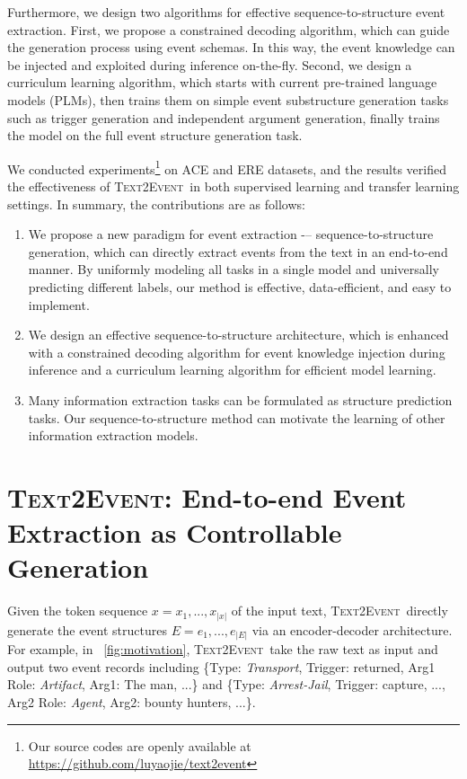 \documentclass[11pt,a4paper]{article}
\newcommand\modelname{\textsc{Text2Event}}
\newcommand{\eventtpye}[1]{\textit{#1}}
\begin{document}
Furthermore, we design two algorithms for effective sequence-to-structure event extraction.
First, we propose a constrained decoding algorithm, which can guide the generation process using event schemas.
In this way, the event knowledge can be injected and exploited during inference on-the-fly.
Second, we design a curriculum learning algorithm, which starts with current pre-trained language models (PLMs), then trains them on simple event substructure generation tasks such as trigger generation and independent argument generation, finally trains the model on the full event structure generation task.

We conducted experiments\footnote{Our source codes are openly
available at \href{https://github.com/luyaojie/text2event}{https://github.com/luyaojie/text2event}} on ACE and ERE datasets, and the results verified the effectiveness of \modelname\, in both supervised learning and transfer learning settings.
In summary, the contributions are as follows:
\begin{enumerate}
    \item We propose a new paradigm for event extraction -– sequence-to-structure generation, which can directly extract events from the text in an end-to-end manner.
    By uniformly modeling all tasks in a single model and universally predicting different labels, our method is effective, data-efficient, and easy to implement.
    \item We design an effective sequence-to-structure architecture, which is enhanced with a constrained decoding algorithm for event knowledge injection during inference and a curriculum learning algorithm for efficient model learning.
    \item Many information extraction tasks can be formulated as structure prediction tasks. Our sequence-to-structure method can motivate the learning of other information extraction models.
\end{enumerate}
 
\section{\modelname: End-to-end Event Extraction as Controllable Generation} \label{sec:model}

Given the token sequence $x=x_{1}, ..., x_{|x|}$ of the input text, \modelname\, directly generate the event structures $E=e_{1},...,e_{|E|}$ via an encoder-decoder architecture.
For example, in \figurename~\ref{fig:motivation},  \modelname\, take the raw text as input and output two event records including \{Type: \eventtpye{Transport}, Trigger: returned, Arg1 Role: \eventtpye{Artifact}, Arg1: The man, ...\} and \{Type: \eventtpye{Arrest-Jail}, Trigger: capture, ..., Arg2 Role: \eventtpye{Agent}, Arg2: bounty hunters, ...\}.
\end{document}
